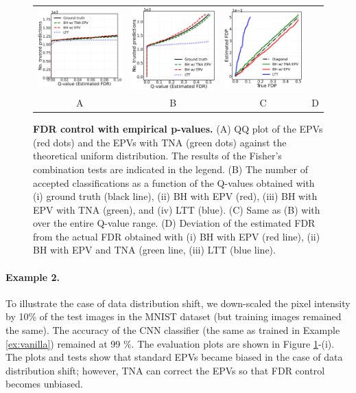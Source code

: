 \documentclass{article}
\begin{document}
\begin{figure}[h!]
\begin{tabular}{cccc}
		\includegraphics[width=1.72in]{img/cnn_balanced_fdr_control_loc.png} &
		\includegraphics[width=1.7in]{img/cnn_balanced_fdr_control.png} & 
		\includegraphics[width=1.59in]{img/cnn_FDPscat_balanced.png} \\		
		A & B & C & D \\
	\end{tabular}
	\caption{{\bf  FDR control with empirical p-values.}
		(A) QQ plot of the EPVs (red dots) and the EPVs with TNA (green dots) against the theoretical uniform distribution. The results of the Fisher's combination tests are indicated in the legend. (B) The number of accepted classifications as a function of the Q-values obtained with (i) ground truth (black line), (ii) BH with EPV (red), (iii) BH with EPV with TNA (green), and (iv) LTT (blue). (C) Same as (B) with over the entire Q-value range. (D) Deviation of the estimated FDR from the actual FDR obtained with (i) BH with EPV (red line), (ii) BH with EPV and TNA (green line, (iii) LTT (blue line).}
	\label{fig:mnist_shfit}
\end{figure}

	
\paragraph{Example 2.} To illustrate the case of data distribution shift, we down-scaled the pixel intensity by 10\% of the test images in the MNIST dataset (but training images remained the same). The accuracy of the CNN classifier (the same as trained in Example \ref{ex:vanilla}) remained at 99 \%. The evaluation plots are shown in Figure \ref{fig:mnist_shfit}-(i). The plots and tests show that standard EPVs became biased in the case of data distribution shift; however, TNA can correct the EPVs so that FDR control becomes unbiased.
\end{document}

